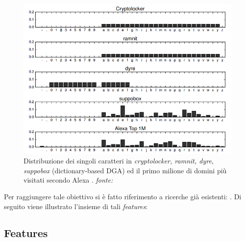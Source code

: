 \begin{figure}[htb]
    \centering
    \includegraphics[width=0.8\columnwidth]{figures/chardistr.png}
    \caption{Distribuzione dei singoli caratteri in \textit{cryptolocker, ramnit, dyre}, \textit{suppobox} (dictionary-based DGA) ed il primo milione di domini più visitati secondo Alexa \cite{amazon:alexa}.
\textit{fonte:} \cite{deepdga}}
\label{fig:relu}
\end{figure}


Per raggiungere tale obiettivo si è fatto riferimento a ricerche già esistenti: \cite{180232} \cite{Yadav:2010:DAG:1879141.1879148} \cite{Yadav:2012:DAG:2428696.2428722} \cite{Schiavoni2014}. Di seguito viene illustrato l'insieme di tali \textit{features}:

\subsection{Features}
\label{randomforestinterno}

